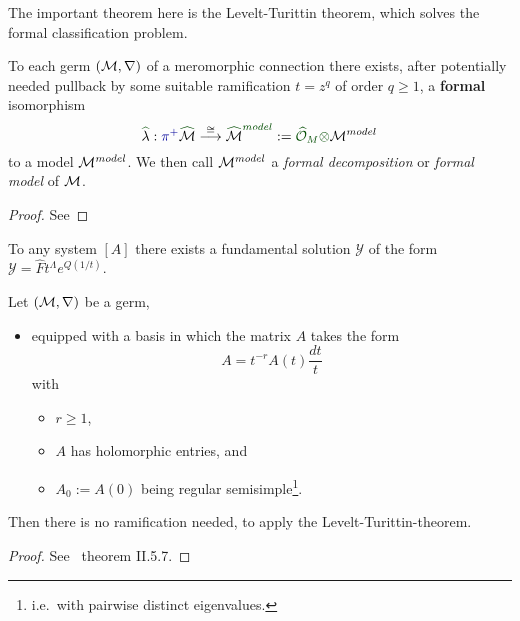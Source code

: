 The important theorem here is the Levelt-Turittin theorem, which solves the
formal classification problem.
\begin{thm}
  To each germ $(\mathcal{M},\nabla)$ of a meromorphic connection there exists, after
  potentially needed \textcolor{blue!60!black}{pullback by some suitable
  ramification $t=z^q$ of order $q\geq1$}, a
  \textcolor{green!30!black}{\textbf{formal}} isomorphism
  \[
    \textcolor{green!30!black}{\hat{\textcolor{black}{\lambda}}}:
    \textcolor{blue!60!black}{\pi^{+}}
    \textcolor{green!30!black}{\hat{\textcolor{black}{\cM}}}
    \overset{\cong}\longrightarrow
    \textcolor{green!30!black}{\hat{\textcolor{black}{\cM}}^{model}}
    :=\textcolor{green!30!black}{\hat\cO_M\otimes}\cM^{model}
  \]
  to a model $\mathcal{M}^{model}$.
  We then call $\mathcal{M}^{model}$ a \emph{formal decomposition} or \emph{formal
  model} of $\mathcal{M}$.
\end{thm}
\begin{proof}
  See \TODO{}
\end{proof}
\begin{cor}
  To any system $[A]$ there exists a fundamental solution $\mathcal{Y}$ of the
  form $\mathcal{Y}=\hat F t^\Lambda e^{Q(1/t)}$.
\end{cor}

\begin{prop}
  Let $(\mathcal{M},\nabla)$ be a germ,
  \begin{itemize}
    \item equipped with a basis in which the matrix $A$ takes the form
      \[
        A=t^{-r}A(t)\frac{dt}{t}
      \]
      with
      \begin{itemize}
        \item $r\geq1$,
        \item $A$ has holomorphic entries, and
        \item $A_0:=A(0)$ being regular semisimple\footnote{i.e.\ with
          pairwise distinct eigenvalues.}.
      \end{itemize}
  \end{itemize}
  Then there is no ramification needed, to apply the Levelt-Turittin-theorem.
  \begin{comment}
    Further, all the summands $\cR_\phi$ have rank one, which is not the case
    in general.
  \end{comment}
\end{prop}
\begin{proof}
  See~\cite{sabbah2007isomonodromic} theorem II.5.7.
\end{proof}

